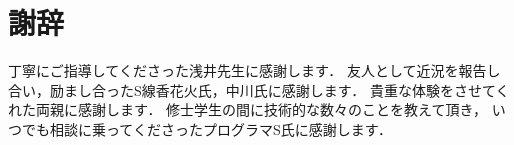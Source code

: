 \chapter*{謝辞}

丁寧にご指導してくださった浅井先生に感謝します．
友人として近況を報告し合い，励まし合ったS線香花火氏，中川氏に感謝します．
貴重な体験をさせてくれた両親に感謝します．
修士学生の間に技術的な数々のことを教えて頂き，
いつでも相談に乗ってくださったプログラマS氏に感謝します．
